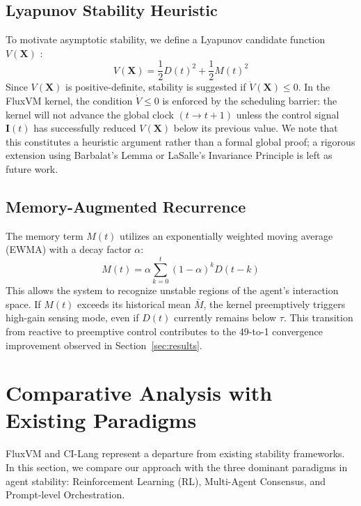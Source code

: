 \documentclass{article}
\begin{document}
\subsection{Lyapunov Stability Heuristic}
To motivate asymptotic stability, we define a Lyapunov candidate function $V(\mathbf{X})$ \cite{lasalle1960some}:
\begin{equation}
    V(\mathbf{X}) = \frac{1}{2} D(t)^2 + \frac{1}{2} M(t)^2
\end{equation}
Since $V(\mathbf{X})$ is positive-definite, stability is suggested if $\dot{V}(\mathbf{X}) \le 0$. In the FluxVM kernel, the condition $\dot{V} \le 0$ is enforced by the scheduling barrier: the kernel will not advance the global clock $(t \to t+1)$ unless the control signal $\mathbf{I}(t)$ has successfully reduced $V(\mathbf{X})$ below its previous value. We note that this constitutes a heuristic argument rather than a formal global proof; a rigorous extension using Barbalat's Lemma or LaSalle's Invariance Principle \cite{khalil2002nonlinear} is left as future work.

\subsection{Memory-Augmented Recurrence}
The memory term $M(t)$ utilizes an exponentially weighted moving average (EWMA) with a decay factor $\alpha$:
\begin{equation}
    M(t) = \alpha \sum_{k=0}^{t} (1-\alpha)^k D(t-k)
\end{equation}
This allows the system to recognize unstable regions of the agent's interaction space. If $M(t)$ exceeds its historical mean $\bar{M}$, the kernel preemptively triggers high-gain sensing mode, even if $D(t)$ currently remains below $\tau$. This transition from reactive to preemptive control contributes to the 49-to-1 convergence improvement observed in Section~\ref{sec:results}.

\newpage

\section{Comparative Analysis with Existing Paradigms}
\label{sec:comparative_analysis}

FluxVM and CI-Lang represent a departure from existing stability frameworks. In this section, we compare our approach with the three dominant paradigms in agent stability: Reinforcement Learning (RL), Multi-Agent Consensus, and Prompt-level Orchestration.
\end{document}
